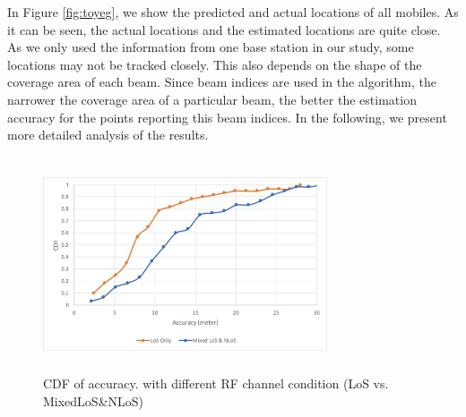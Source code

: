 \documentclass[conference, 10pt]{IEEEtran}
\begin{document}
\begin{NoHyper}
In Figure \ref{fig:toyeg}, we show the predicted and actual locations of all mobiles. As it can be seen, the actual locations
and the estimated locations are quite close. As we only used the information from one base station in our study, some locations may not be tracked closely. This also depends on the shape of the coverage
area of each beam. Since beam indices are used in the algorithm, the narrower the coverage area of a particular beam, the better the estimation accuracy for the points reporting this beam indices.
In the following, we present more
detailed analysis of the results.

\begin{figure}[t]
\begin{center}
 \includegraphics[height=2.5in, width=3.3in]{./Accuracy_ChannelModel.png}
\caption{CDF of accuracy.\label{fig:leapperf} with different RF channel condition (LoS vs. MixedLoS\&NLoS)}
\end{center}
\end{figure}


\end{NoHyper}
\end{document}
